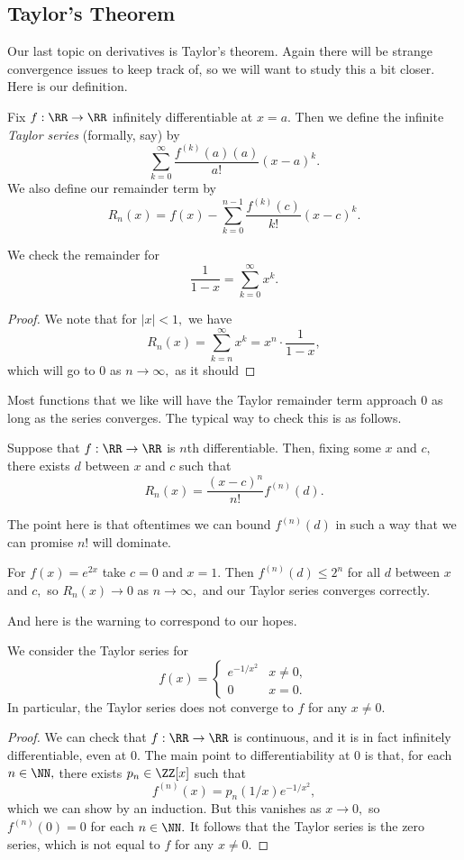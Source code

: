\subsection{Taylor's Theorem}
Our last topic on derivatives is Taylor's theorem. Again there will be strange convergence issues to keep track of, so we will want to study this a bit closer. Here is our definition.
\begin{defi}
	Fix $f:\RR\to\RR$ infinitely differentiable at $x=a.$ Then we define the infinite \textit{Taylor series} (formally, say) by
	\[\sum_{k=0}^\infty\frac{f^{(k)}(a)(a)}{a!}(x-a)^k.\]
	We also define our remainder term by
	\[R_n(x)=f(x)-\sum_{k=0}^{n-1}\frac{f^{(k)}(c)}{k!}(x-c)^k.\]
\end{defi}
\begin{exe}
	We check the remainder for
	\[\frac1{1-x}=\sum_{k=0}^\infty x^k.\]
\end{exe}
\begin{proof}
	We note that for $|x|<1,$ we have
	\[R_n(x)=\sum_{k=n}^\infty x^k=x^n\cdot\frac1{1-x},\]
	which will go to $0$ as $n\to\infty,$ as it should
\end{proof}
Most functions that we like will have the Taylor remainder term approach $0$ as long as the series converges. The typical way to check this is as follows.
\begin{proposition}
	Suppose that $f:\RR\to\RR$ is $n$th differentiable. Then, fixing some $x$ and $c,$ there exists $d$ between $x$ and $c$ such that
	\[R_n(x)=\frac{(x-c)^n}{n!}f^{(n)}(d).\]
\end{proposition}
The point here is that oftentimes we can bound $f^{(n)}(d)$ in such a way that we can promise $n!$ will dominate.
\begin{example}
	For $f(x)=e^{2x}$ take $c=0$ and $x=1.$ Then $f^{(n)}(d)\le2^n$ for all $d$ between $x$ and $c,$ so $R_n(x)\to0$ as $n\to\infty,$ and our Taylor series converges correctly.
\end{example}
And here is the warning to correspond to our hopes.
\begin{exe}
	We consider the Taylor series for
	\[f(x)=\begin{cases}
		e^{-1/x^2} & x\ne0, \\
		0 & x=0.
	\end{cases}\]
	In particular, the Taylor series does not converge to $f$ for any $x\ne0.$
\end{exe}
\begin{proof}
	We can check that $f:\RR\to\RR$ is continuous, and it is in fact infinitely differentiable, even at $0.$ The main point to differentiability at $0$ is that, for each $n\in\NN,$ there exists $p_n\in\ZZ[x]$ such that
	\[f^{(n)}(x)=p_n(1/x)e^{-1/x^2},\]
	which we can show by an induction. But this vanishes as $x\to0,$ so $f^{(n)}(0)=0$ for each $n\in\NN.$ It follows that the Taylor series is the zero series, which is not equal to $f$ for any $x\ne0.$
\end{proof}
